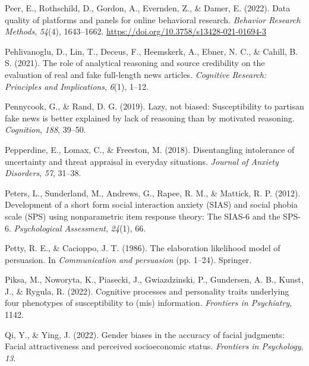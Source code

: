 \documentclass[
  man,floatsintext]{apa6}
\newlength{\cslhangindent}
\newlength{\cslentryspacingunit} %
\newenvironment{CSLReferences}[2] %
 {%
  \setlength{\parindent}{0pt}
  \ifodd #1
  \let\oldpar\par
  \def\par{\hangindent=\cslhangindent\oldpar}
  \fi
  \setlength{\parskip}{#2\cslentryspacingunit}
 }%
 {}
\begin{document}
\begin{CSLReferences}{1}{0}
\leavevmode{}%
Peer, E., Rothschild, D., Gordon, A., Evernden, Z., \& Damer, E. (2022). Data quality of platforms and panels for online behavioral research. \emph{Behavior Research Methods}, \emph{54}(4), 1643--1662. \url{https://doi.org/10.3758/s13428-021-01694-3}

\leavevmode{}%
Pehlivanoglu, D., Lin, T., Deceus, F., Heemskerk, A., Ebner, N. C., \& Cahill, B. S. (2021). The role of analytical reasoning and source credibility on the evaluation of real and fake full-length news articles. \emph{Cognitive Research: Principles and Implications}, \emph{6}(1), 1--12.

\leavevmode{}%
Pennycook, G., \& Rand, D. G. (2019). Lazy, not biased: Susceptibility to partisan fake news is better explained by lack of reasoning than by motivated reasoning. \emph{Cognition}, \emph{188}, 39--50.

\leavevmode{}%
Pepperdine, E., Lomax, C., \& Freeston, M. (2018). Disentangling intolerance of uncertainty and threat appraisal in everyday situations. \emph{Journal of Anxiety Disorders}, \emph{57}, 31--38.

\leavevmode{}%
Peters, L., Sunderland, M., Andrews, G., Rapee, R. M., \& Mattick, R. P. (2012). Development of a short form social interaction anxiety (SIAS) and social phobia scale (SPS) using nonparametric item response theory: The SIAS-6 and the SPS-6. \emph{Psychological Assessment}, \emph{24}(1), 66.

\leavevmode{}%
Petty, R. E., \& Cacioppo, J. T. (1986). The elaboration likelihood model of persuasion. In \emph{Communication and persuasion} (pp. 1--24). Springer.

\leavevmode{}%
Piksa, M., Noworyta, K., Piasecki, J., Gwiazdzinski, P., Gundersen, A. B., Kunst, J., \& Rygula, R. (2022). Cognitive processes and personality traits underlying four phenotypes of susceptibility to (mis) information. \emph{Frontiers in Psychiatry}, 1142.

\leavevmode{}%
Qi, Y., \& Ying, J. (2022). Gender biases in the accuracy of facial judgments: Facial attractiveness and perceived socioeconomic status. \emph{Frontiers in Psychology}, \emph{13}.


\end{CSLReferences}
\end{document}
